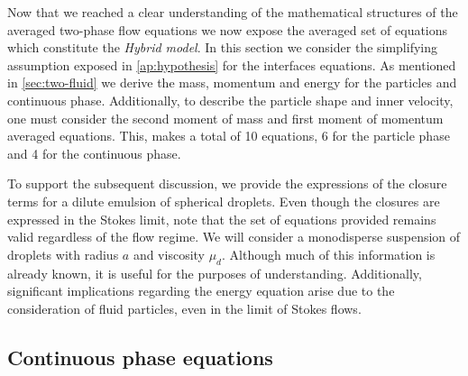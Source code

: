 
Now that we reached a clear understanding of the mathematical structures of the averaged two-phase flow equations we now expose the averaged set of equations which constitute the \textit{Hybrid model}. 
In this section we consider the simplifying assumption exposed in \ref{ap:hypothesis} for the interfaces equations. 
As mentioned in \ref{sec:two-fluid} we derive the mass, momentum and energy for the particles and continuous phase. 
Additionally, to describe the particle shape and inner velocity, one must consider the second moment of mass and first moment of momentum averaged equations. 
This, makes a total of 10 equations, 6 for the particle phase and 4 for the continuous phase.

To support the subsequent discussion, we provide the expressions of the closure terms for a dilute emulsion of spherical droplets. 
Even though the closures are expressed in the Stokes limit, note that the set of equations provided remains valid regardless of the flow regime.
We will consider a monodisperse suspension of droplets with radius $a$ and viscosity $\mu_d$. 
Although much of this information is already known, it is useful for the purposes of understanding. 
Additionally, significant implications regarding the energy equation arise due to the consideration of fluid particles, even in the limit of Stokes flows. 

\subsection{Continuous phase equations}

